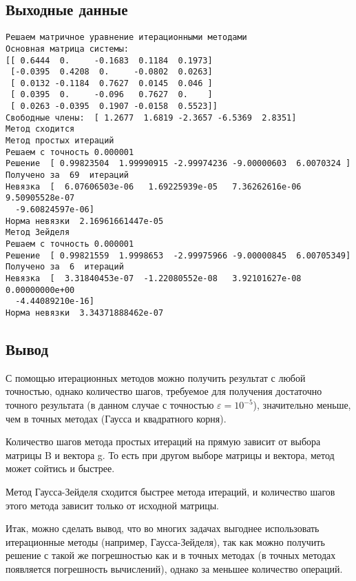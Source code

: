 \documentclass[11.4pt]{article}
\begin{document}
	\subsection{Выходные данные}
\begin{verbatim}
Решаем матричное уравнение итерационными методами
Основная матрица системы:
[[ 0.6444  0.     -0.1683  0.1184  0.1973]
 [-0.0395  0.4208  0.     -0.0802  0.0263]
 [ 0.0132 -0.1184  0.7627  0.0145  0.046 ]
 [ 0.0395  0.     -0.096   0.7627  0.    ]
 [ 0.0263 -0.0395  0.1907 -0.0158  0.5523]]
Свободные члены:  [ 1.2677  1.6819 -2.3657 -6.5369  2.8351]
Метод сходится
Метод простых итераций
Решаем с точность 0.000001
Решение  [ 0.99823504  1.99990915 -2.99974236 -9.00000603  6.0070324 ] 
Получено за  69  итераций
Невязка  [  6.07606503e-06   1.69225939e-05   7.36262616e-06   9.50905528e-07
  -9.60824597e-06]
Норма невязки  2.16961661447e-05
Метод Зейделя
Решаем с точность 0.000001
Решение  [ 0.99821559  1.9998653  -2.99975966 -9.00000845  6.00705349] 
Получено за  6  итераций
Невязка  [  3.31840453e-07  -1.22080552e-08   3.92101627e-08   0.00000000e+00
  -4.44089210e-16]
Норма невязки  3.34371888462e-07
 \end{verbatim}
	\subsection{Вывод}
 С помощью итерационных методов можно получить результат с любой точностью, однако количество шагов, требуемое для получения достаточно точного результата (в данном случае с точностью $\varepsilon=10^{-5}$), значительно меньше, чем в точных методах (Гаусса и квадратного корня).\par Количество шагов метода простых итераций на прямую зависит от выбора матрицы B и вектора g. То есть при другом выборе матрицы и вектора, метод может сойтись и быстрее.\par
Метод Гаусса-Зейделя сходится быстрее метода итераций, и количество шагов этого метода зависит только от исходной матрицы.\par Итак, можно сделать вывод, что во многих задачах выгоднее использовать итерационные методы (например, Гаусса-Зейделя), так как можно получить решение с такой же погрешностью как и в точных методах (в точных методах появляется погрешность вычислений), однако за меньшее количество операций.
\newpage
\end{document}
